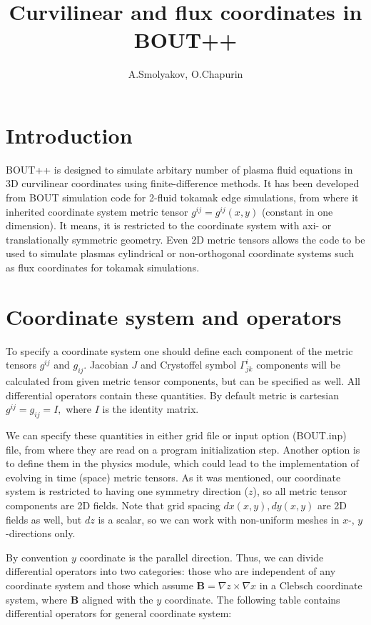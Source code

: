 \documentclass[11pt, oneside]{article}
\title{Curvilinear and flux coordinates in BOUT++}
\author{A.Smolyakov, O.Chapurin}
\begin{document}
\maketitle

\tableofcontents
\newpage

\section{Introduction}
BOUT++ \cite{dudson2009bout++} is designed to simulate arbitary number of plasma fluid equations in 3D curvilinear coordinates using finite-difference methods. It has been developed from BOUT \cite{umansky2006bout} simulation code for 2-fluid tokamak edge simulations, from where it inherited coordinate system metric tensor $g^{ij} = g^{ij}\left(x,y\right)$ (constant in one dimension). It means, it is restricted to the coordinate system with axi- or translationally symmetric geometry. Even 2D metric tensors allows the code to be used to simulate plasmas cylindrical or non-orthogonal coordinate systems such as flux coordinates for tokamak simulations.
\section{Coordinate system and operators}
To specify a coordinate system one should define each component of the metric tensors $g^{ij}$ and $g_{ij}$. Jacobian $J$ and Crystoffel symbol $\Gamma^i_{jk}$ components will be calculated from given metric tensor components, but can be specified as well. All differential operators contain these quantities. By default metric is cartesian $g^{ij} = g_{ij} = I,$ where $I$ is the identity matrix.

We can specify these quantities in either grid file or input option (BOUT.inp) file, from where they are read on a program initialization step. Another option is to define them in the physics module, which could lead to the implementation of evolving in time (space) metric tensors. As it was mentioned, our coordinate system is restricted to having one symmetry direction ($z$), so all metric tensor components are 2D fields. Note that grid spacing $dx\left(x,y\right), dy\left(x,y\right)$ are 2D fields as well, but $dz$ is a scalar, so we can work with non-uniform meshes in $x$-, $y$-directions only.

By convention $y$ coordinate is the parallel direction. Thus, we can divide differential operators into two categories: those who are independent of any coordinate system and those which assume $\mathbf{B} = \nabla z \times \nabla x$ in a Clebsch coordinate system, where $\mathbf{B}$ aligned with the $y$ coordinate. The following table contains differential operators for general coordinate system:
\newline
\end{document}
